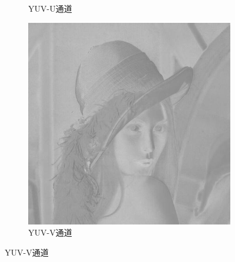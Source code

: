 \begin{figure}[ht]
\begin{subfigure}{0.245\textwidth}
        \caption{YUV-U通道}
        \label{Fig:RGB2YUV-u}
      \end{subfigure}
      \begin{subfigure}{0.245\textwidth}
        \includegraphics[width=\linewidth]{pages/jpeg/yuv-v.jpg}
        \caption{YUV-V通道}
        \label{Fig:RGB2YUV-v}
      \end{subfigure}


\end{figure}

